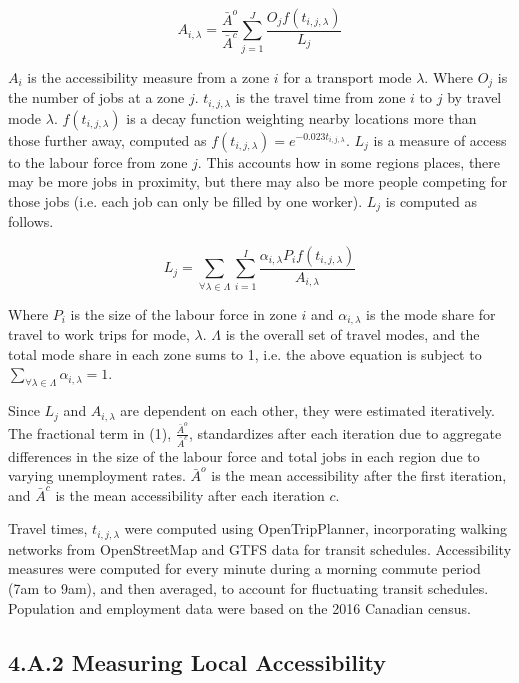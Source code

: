 \begin{equation}
A_{i,\lambda} = \frac{\bar A^o}{\bar A^c} \sum_{j = 1}^{J} \frac{ O_j f(t_{i,j,\lambda})}{L_{j}}
\end{equation}

$A_i$ is the accessibility measure from a zone $i$ for a transport mode $\lambda$. Where $O_j$ is the number of jobs at a zone $j$. $t_{i,j,\lambda}$ is the travel time from zone $i$ to $j$ by travel mode $\lambda$. $f(t_{i,j,\lambda})$ is a decay function weighting nearby locations more than those further away, computed as $f(t_{i,j,\lambda}) = e^{-0.023 t_{i,j,\lambda}}$. $L_j$ is a measure of access to the labour force from zone $j$. This accounts how in some regions places, there may be more jobs in proximity, but there may also be more people competing for those jobs (i.e. each job can only be filled by one worker). $L_j$ is computed as follows.

\begin{equation}
L_j = \sum_{\forall \lambda \in \Lambda} \sum_{i = 1}^{I} \frac{ \alpha_{i,\lambda} P_i f(t_{i,j,\lambda})}{A_{i,\lambda}}
\end{equation}



Where $P_i$ is the size of the labour force in zone $i$ and $\alpha_{i,\lambda}$ is the mode share for travel to work trips for mode, $\lambda$. $\Lambda$ is the overall set of travel modes, and the total mode share in each zone sums to 1, i.e. the above equation is subject to $\sum_{\forall \lambda \in \Lambda} { \alpha_{i,\lambda} = 1}$.

Since $L_j$ and $A_{i,\lambda}$ are dependent on each other, they were estimated iteratively. The fractional term in (1), $\frac{\bar A^o}{\bar A^c}$, standardizes after each iteration due to aggregate differences in the size of the labour force and total jobs in each region due to varying unemployment rates. $\bar A^o$ is the mean accessibility after the first iteration, and $\bar A^c$ is the mean accessibility after each iteration $c$.

Travel times, $t_{i,j,\lambda}$ were computed using OpenTripPlanner, incorporating walking networks from OpenStreetMap and GTFS data for transit schedules. Accessibility measures were computed for every minute during a morning commute period (7am to 9am), and then averaged, to account for fluctuating transit schedules. Population and employment data were based on the 2016 Canadian census. 


\subsection*{4.A.2 \hspace{2mm} Measuring Local Accessibility}

